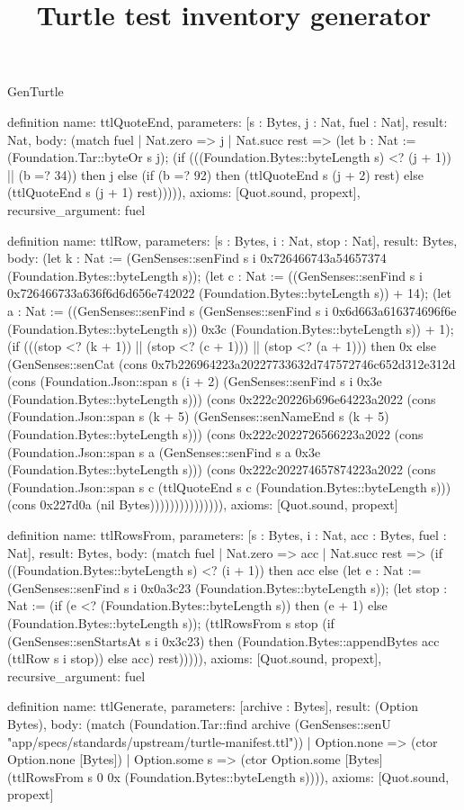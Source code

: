 \begin{lexlean}{GenTurtle}
\title{Turtle test inventory generator}
\begin{semanticmodule}
definition{
  name: ttlQuoteEnd,
  parameters: [s : Bytes, j : Nat, fuel : Nat],
  result: Nat,
  body: (match fuel
    | Nat.zero => j
    | Nat.succ rest => (let b : Nat := (Foundation.Tar::byteOr s j); (if (((Foundation.Bytes::byteLength s) <? (j + 1)) || (b =? 34)) then j else (if (b =? 92) then (ttlQuoteEnd s (j + 2) rest) else (ttlQuoteEnd s (j + 1) rest))))),
  axioms: [Quot.sound, propext],
  recursive_argument: fuel
}

definition{
  name: ttlRow,
  parameters: [s : Bytes, i : Nat, stop : Nat],
  result: Bytes,
  body: (let k : Nat := (GenSenses::senFind s i 0x726466743a54657374 (Foundation.Bytes::byteLength s)); (let c : Nat := ((GenSenses::senFind s i 0x726466733a636f6d6d656e742022 (Foundation.Bytes::byteLength s)) + 14); (let a : Nat := ((GenSenses::senFind s (GenSenses::senFind s i 0x6d663a616374696f6e (Foundation.Bytes::byteLength s)) 0x3c (Foundation.Bytes::byteLength s)) + 1); (if (((stop <? (k + 1)) || (stop <? (c + 1))) || (stop <? (a + 1))) then 0x else (GenSenses::senCat (cons 0x7b226964223a20227733632d747572746c652d312e312d (cons (Foundation.Json::span s (i + 2) (GenSenses::senFind s i 0x3e (Foundation.Bytes::byteLength s))) (cons 0x222c20226b696e64223a2022 (cons (Foundation.Json::span s (k + 5) (GenSenses::senNameEnd s (k + 5) (Foundation.Bytes::byteLength s))) (cons 0x222c2022726566223a2022 (cons (Foundation.Json::span s a (GenSenses::senFind s a 0x3e (Foundation.Bytes::byteLength s))) (cons 0x222c202274657874223a2022 (cons (Foundation.Json::span s c (ttlQuoteEnd s c (Foundation.Bytes::byteLength s))) (cons 0x227d0a (nil Bytes))))))))))))))),
  axioms: [Quot.sound, propext]
}

definition{
  name: ttlRowsFrom,
  parameters: [s : Bytes, i : Nat, acc : Bytes, fuel : Nat],
  result: Bytes,
  body: (match fuel
    | Nat.zero => acc
    | Nat.succ rest => (if ((Foundation.Bytes::byteLength s) <? (i + 1)) then acc else (let e : Nat := (GenSenses::senFind s i 0x0a3c23 (Foundation.Bytes::byteLength s)); (let stop : Nat := (if (e <? (Foundation.Bytes::byteLength s)) then (e + 1) else (Foundation.Bytes::byteLength s)); (ttlRowsFrom s stop (if (GenSenses::senStartsAt s i 0x3c23) then (Foundation.Bytes::appendBytes acc (ttlRow s i stop)) else acc) rest))))),
  axioms: [Quot.sound, propext],
  recursive_argument: fuel
}

definition{
  name: ttlGenerate,
  parameters: [archive : Bytes],
  result: (Option Bytes),
  body: (match (Foundation.Tar::find archive (GenSenses::senU "app/specs/standards/upstream/turtle-manifest.ttl"))
    | Option.none => (ctor Option.none [Bytes])
    | Option.some s => (ctor Option.some [Bytes] (ttlRowsFrom s 0 0x (Foundation.Bytes::byteLength s)))),
  axioms: [Quot.sound, propext]
}
\end{semanticmodule}
\end{lexlean}

